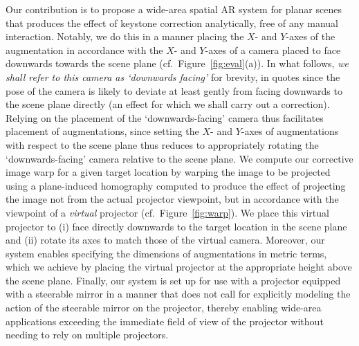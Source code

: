 \documentclass[review]{elsarticle}
\begin{document}
Our contribution is to propose a wide-area spatial AR system for planar scenes that produces the effect of keystone correction analytically, free of any manual interaction. Notably, we do this in a manner placing the $X$- and $Y$-axes of the augmentation in accordance with the $X$- and $Y$-axes of a camera placed to face downwards towards the scene plane (cf.\ Figure~\ref{fig:eval}(a)). In what follows,  \textit{we shall refer to this camera as `downwards facing'} for brevity, in quotes since the pose of the camera is likely to deviate at least gently from facing downwards to the scene plane directly (an effect for which we shall carry out a correction). Relying on the placement of the `downwards-facing' camera thus facilitates placement of augmentations, since setting the $X$- and $Y$-axes of augmentations with respect to the scene plane thus reduces to appropriately rotating the `downwards-facing' camera relative to the scene plane. We compute our corrective image warp for a given target location by warping the image to be projected using a plane-induced homography computed to produce the effect of projecting the image not from the actual projector viewpoint, but in accordance with the viewpoint of a \textit{virtual} projector (cf.\ Figure~\ref{fig:warp}). We place this virtual projector to (i) face directly downwards to the target location in the scene plane and (ii) rotate its axes to match those of the virtual camera. Moreover, our system enables specifying the dimensions of augmentations in metric terms, which we achieve by placing the virtual projector at the appropriate height above the scene plane. Finally, our system is set up for use with a projector equipped with a steerable mirror in a manner that does not call for explicitly modeling the action of the steerable mirror on the projector, thereby enabling wide-area applications exceeding the immediate field of view of the projector without needing to rely on multiple projectors.

\end{document}
